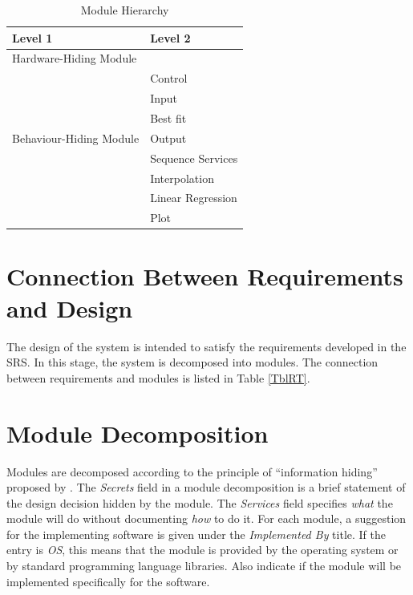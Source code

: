 \documentclass[12pt, titlepage]{article}
\begin{document}
\begin{table}[h!]
\centering
\begin{tabular}{p{} p{}}
\toprule
\textbf{Level 1} & \textbf{Level 2}\\
\midrule

{Hardware-Hiding Module} & ~ \\
\midrule

\multirow{7}{0.3\textwidth}{Behaviour-Hiding Module} & Control\\
& Input\\
& Best fit\\
& Output\\

\midrule

\multirow{3}{0.3\textwidth}{Software Decision Module} & Sequence Services\\
& Interpolation\\
& Linear Regression\\
& Plot\\
\bottomrule

\end{tabular}
\caption{Module Hierarchy}
\label{TblMH}
\end{table}

\section{Connection Between Requirements and Design} \label{SecConnection}

The design of the system is intended to satisfy the requirements developed in
the SRS. In this stage, the system is decomposed into modules. The connection
between requirements and modules is listed in Table \ref{TblRT}.

\section{Module Decomposition} \label{SecMD}

Modules are decomposed according to the principle of ``information hiding''
proposed by \citet{ParnasEtAl1984}. The \emph{Secrets} field in a module
decomposition is a brief statement of the design decision hidden by the
module. The \emph{Services} field specifies \emph{what} the module will do
without documenting \emph{how} to do it. For each module, a suggestion for the
implementing software is given under the \emph{Implemented By} title. If the
entry is \emph{OS}, this means that the module is provided by the operating
system or by standard programming language libraries.  Also indicate if the
module will be implemented specifically for the software.
\end{document}
